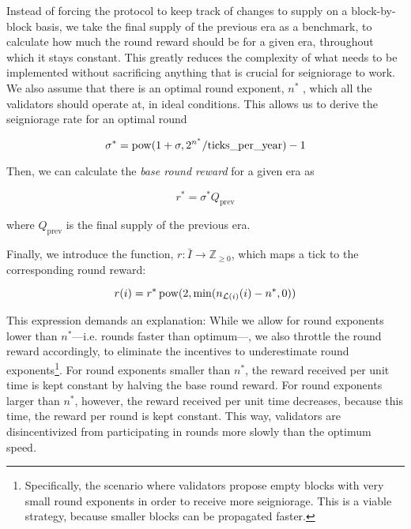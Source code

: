 Instead of forcing the protocol to keep track of changes to supply on a block-by-block basis, we take the final supply of the previous era as a benchmark, to calculate how much the round reward should be for a given era, throughout which it stays constant. This greatly reduces the complexity of what needs to be implemented without sacrificing anything that is crucial for seigniorage to work. We also assume that there is an optimal round exponent, $n^\ast$ , which all the validators should operate at, in ideal conditions. This allows us to derive the seigniorage rate for an optimal round

\begin{equation}
  \sigma^\ast = \operatorname*{pow}(1 + \sigma, 2^{n^\ast}/\text{ticks\_per\_year}) - 1
\end{equation}

Then, we can calculate the \emph{base round reward} for a given era as

\begin{equation}
  r^\ast = \sigma^\ast Q_\text{prev}
\end{equation}

where $Q_\text{prev}$ is the final supply of the previous era.

Finally, we introduce the function, $r:\bar{I}\to \mathbb{Z}_{\geq 0}$, which maps a tick to the corresponding round reward:

\begin{equation}
  r(i) = r^\ast\operatorname*{pow}(2, {\min(n_{\mathcal{L}(i)}(i) - n^\ast, 0)})
\end{equation}

This expression demands an explanation: While we allow for round exponents lower than $n^\ast$---i.e. rounds faster than optimum---, we also throttle the round reward accordingly, to eliminate the incentives to underestimate round exponents\footnote{Specifically, the scenario where validators propose empty blocks with very small round exponents in order to receive more seigniorage. This is a viable strategy, because smaller blocks can be propagated faster.}. For round exponents smaller than $n^\ast$, the reward received per unit time is kept constant by halving the base round reward. For round exponents larger than $n^\ast$, however, the reward received per unit time decreases, because this time, the reward per round is kept constant. This way, validators are disincentivized from participating in rounds more slowly than the optimum speed.

